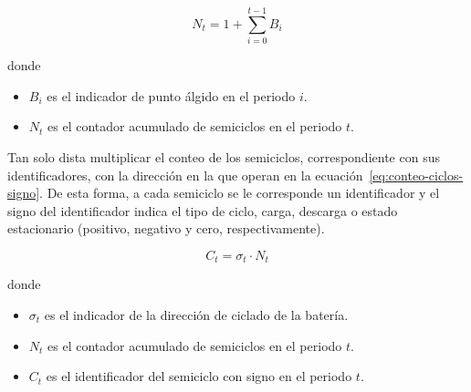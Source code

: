   \begin{samepage}

    \begin{equation}
      \label{eq:conteo-ciclos}
      N_{t} = 1 + \sum_{i=0}^{t-1} B_{i}
    \end{equation}

    donde

    \begin{itemize}

      \item \( B_{i} \) es el indicador de punto álgido en el periodo \( i \).

      \item \( N_{t} \) es el contador acumulado de semiciclos en el periodo \( t \).

    \end{itemize}

  \end{samepage}

  Tan solo dista multiplicar el conteo de los semiciclos, correspondiente con sus identificadores, con la dirección en la que operan en la ecuación~\ref{eq:conteo-ciclos-signo}. De esta forma, a cada semiciclo se le corresponde un identificador y el signo del identificador indica el tipo de ciclo, carga, descarga o estado estacionario (positivo, negativo y cero, respectivamente).

  \begin{samepage}

    \begin{equation}
      \label{eq:conteo-ciclos-signo}
      C_{t} = \sigma_{t} \cdot N_{t}
    \end{equation}

    donde

    \begin{itemize}

      \item \( \sigma_{t} \) es el indicador de la dirección de ciclado de la batería.

      \item \( N_{t} \) es el contador acumulado de semiciclos en el periodo \( t \).

      \item \( C_{t} \) es el identificador del semiciclo con signo en el periodo \( t \).

    \end{itemize}

  \end{samepage}

